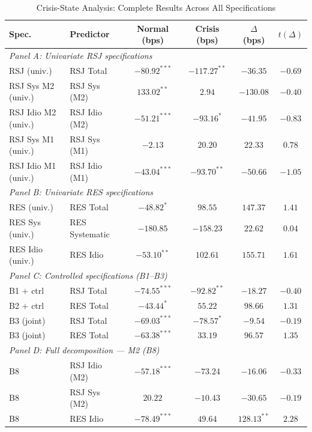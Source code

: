 \documentclass[11pt,a4paper]{article}
\begin{document}
\begin{table}[!htbp]
\centering
\caption{Crisis-State Analysis: Complete Results Across All Specifications}
\label{tab:crisis_full}
\small
\begin{threeparttable}
\begin{tabular}{l l c c c c}
\toprule
Spec. & Predictor
  & Normal (bps) & Crisis (bps) & $\Delta$ (bps) & $t(\Delta)$ \\
\midrule
\multicolumn{6}{l}{\textit{Panel A: Univariate RSJ specifications}} \\[2pt]
RSJ (univ.) & RSJ Total & $-80.92^{***}$ & $-117.27^{**}$ & $-36.35$ & $-0.69$ \\
RSJ Sys M2 (univ.) & RSJ Sys (M2) & $133.02^{**}$ & $2.94$ & $-130.08$ & $-0.40$ \\
RSJ Idio M2 (univ.) & RSJ Idio (M2) & $-51.21^{***}$ & $-93.16^{*}$ & $-41.95$ & $-0.83$ \\
RSJ Sys M1 (univ.) & RSJ Sys (M1) & $-2.13$ & $20.20$ & $22.33$ & $0.78$ \\
RSJ Idio M1 (univ.) & RSJ Idio (M1) & $-43.04^{***}$ & $-93.70^{**}$ & $-50.66$ & $-1.05$ \\[5pt]
\multicolumn{6}{l}{\textit{Panel B: Univariate RES specifications}} \\[2pt]
RES (univ.) & RES Total & $-48.82^{*}$ & $98.55$ & $147.37$ & $1.41$ \\
RES Sys (univ.) & RES Systematic & $-180.85$ & $-158.23$ & $22.62$ & $0.04$ \\
RES Idio (univ.) & RES Idio & $-53.10^{**}$ & $102.61$ & $155.71$ & $1.61$ \\[5pt]
\multicolumn{6}{l}{\textit{Panel C: Controlled specifications (B1--B3)}} \\[2pt]
B1 $+$ ctrl & RSJ Total & $-74.55^{***}$ & $-92.82^{**}$ & $-18.27$ & $-0.40$ \\
B2 $+$ ctrl & RES Total & $-43.44^{*}$ & $55.22$ & $98.66$ & $1.31$ \\
B3 (joint) & RSJ Total & $-69.03^{***}$ & $-78.57^{*}$ & $-9.54$ & $-0.19$ \\
B3 (joint) & RES Total & $-63.38^{***}$ & $33.19$ & $96.57$ & $1.35$ \\[5pt]
\multicolumn{6}{l}{\textit{Panel D: Full decomposition --- M2 (B8)}} \\[2pt]
B8 & RSJ Idio (M2) & $-57.18^{***}$ & $-73.24$ & $-16.06$ & $-0.33$ \\
B8 & RSJ Sys (M2) & $20.22$ & $-10.43$ & $-30.65$ & $-0.19$ \\
B8 & RES Idio & $-78.49^{***}$ & $49.64$ & $128.13^{**}$ & $2.28$ \\

\end{tabular}
\end{threeparttable}
\end{table}
\end{document}
